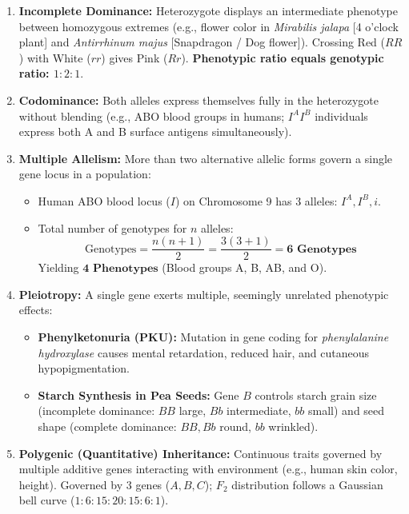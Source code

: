 \documentclass[10pt,twoside,openright]{book}
\begin{document}
\begin{conceptbox}
\begin{enumerate}[leftmargin=*]
  \item \textbf{Incomplete Dominance:} Heterozygote displays an intermediate phenotype between homozygous extremes (e.g., flower color in \textit{Mirabilis jalapa} [4 o'clock plant] and \textit{Antirrhinum majus} [Snapdragon / Dog flower]). Crossing Red ($RR$) with White ($rr$) gives Pink ($Rr$). \textbf{Phenotypic ratio equals genotypic ratio: $1 : 2 : 1$}.
  \item \textbf{Codominance:} Both alleles express themselves fully in the heterozygote without blending (e.g., ABO blood groups in humans; $I^A I^B$ individuals express both A and B surface antigens simultaneously).
  \item \textbf{Multiple Allelism:} More than two alternative allelic forms govern a single gene locus in a population:
  \begin{itemize}
    \item Human ABO blood locus ($I$) on Chromosome 9 has 3 alleles: $I^A, I^B, i$.
    \item Total number of genotypes for $n$ alleles:
    \[
      \text{Genotypes} = \frac{n(n+1)}{2} = \frac{3(3+1)}{2} = \mathbf{6\text{ Genotypes}}
    \]
    Yielding $\mathbf{4\text{ Phenotypes}}$ (Blood groups A, B, AB, and O).
  \end{itemize}
  \item \textbf{Pleiotropy:} A single gene exerts multiple, seemingly unrelated phenotypic effects:
  \begin{itemize}
    \item \textbf{Phenylketonuria (PKU):} Mutation in gene coding for \textit{phenylalanine hydroxylase} causes mental retardation, reduced hair, and cutaneous hypopigmentation.
    \item \textbf{Starch Synthesis in Pea Seeds:} Gene $B$ controls starch grain size (incomplete dominance: $BB$ large, $Bb$ intermediate, $bb$ small) and seed shape (complete dominance: $BB, Bb$ round, $bb$ wrinkled).
  \end{itemize}
  \item \textbf{Polygenic (Quantitative) Inheritance:} Continuous traits governed by multiple additive genes interacting with environment (e.g., human skin color, height). Governed by 3 genes ($A, B, C$); $F_2$ distribution follows a Gaussian bell curve ($1 : 6 : 15 : 20 : 15 : 6 : 1$).
\end{enumerate}
\end{conceptbox}
\end{document}

